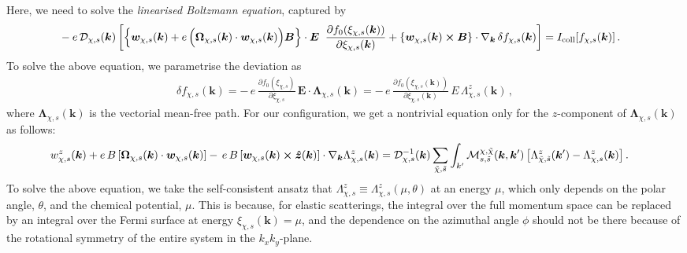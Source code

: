 \documentclass[aps,prb,onecolumn,nofootinbib,citeautoscript,10pt]{revtex4-2}
\begin{document}
Here, we need to solve the \textit{linearised Boltzmann equation}, captured by
\begin{align}
\label{eqkin5}
& - e\, {\mathcal D}_{\chi, s} ({\boldsymbol k})
 \left [
\left \lbrace {\boldsymbol{w}}_{\chi, s} ({\boldsymbol k})
+ e \,\Big(
{\boldsymbol \Omega}_{\chi, s} ({\boldsymbol k}) 
\cdot {\boldsymbol{w}}_{\chi, s}   ({\boldsymbol k})
 \Big )  \boldsymbol B \right \rbrace
\cdot {\boldsymbol E}  
\; \;	\frac{\partial  f_0 (\xi_{\chi, s}({\boldsymbol k})) }
 {\partial \xi_{\chi, s}({\boldsymbol k}) }
+  
\left \lbrace   {\boldsymbol{w}}_{\chi, s} ({\boldsymbol k})
\cross  {\boldsymbol B}  \right \rbrace
\cdot \nabla_{\boldsymbol k}
\, \delta f_{\chi, s} (\boldsymbol k) \right] 
 =  I_{\text{coll}} [f_{\chi, s} ({\boldsymbol k})] \,.
\end{align}
To solve the above equation, we parametrise the deviation as
\begin{align}
\label{eqansatz}
	\delta f_{\chi, s} (\boldsymbol {k}) =
-\,	 e\, 	\frac{\partial  f_0 (\xi_{\chi, s}) } {\partial \xi_{\chi, s} } 
	\,   {\boldsymbol E}  \cdot \bm{\Lambda}_{\chi, s} (\boldsymbol {k} )
=
-\,	 e\, 	\frac{\partial  f_0 (\xi_{\chi, s}({\boldsymbol k})) }
 {\partial \xi_{\chi, s} ({\boldsymbol k})} 
	\,   E \, {\Lambda}^z_{\chi, s} ( \boldsymbol {k} ) \,,
\end{align}
where $ \bm{\Lambda}_{\chi, s} (\boldsymbol {k} ) $ is the vectorial mean-free path. For our configuration, we get a nontrivial equation only for the $z$-component of $ \bm{\Lambda}_{\chi, s} ( \boldsymbol {k} ) $ as follows:
\begin{align}
\label{eqvec}
&  w^z_{\chi, s} ({\boldsymbol k})
+ e \, B \left [
{\boldsymbol \Omega}_{\chi, s}  ({\boldsymbol k})
 \cdot {\boldsymbol{w}}_{\chi, s} ({\boldsymbol k})  \right ]
-\, 
e \, B \left [ {\boldsymbol{w}}_{\chi, s} ({\boldsymbol k}) \cross   
\boldsymbol{\hat z}  ({\boldsymbol k}) \right ] 
\cdot \nabla_{\boldsymbol k} {\Lambda}^z_{\chi, s} (\boldsymbol {k} )  
 = {\mathcal D}^{-1}_{\chi, s}  ({\boldsymbol k})
\sum \limits_{\tilde \chi, \tilde s}
\int_{k'}
\mathcal{M}^{\chi, \tilde \chi}_{ s, \tilde s} (\boldsymbol k,\boldsymbol k^\prime)
\left[ 
 {\Lambda}^z_{ \tilde \chi, \tilde s} (\boldsymbol {k}^\prime ) 
 -  {\Lambda}^z_{\chi, s} (\boldsymbol {k} )  
 \right ].
\end{align}
To solve the above equation, we take the self-consistent ansatz \cite{timm} that 
$ {\Lambda}^z_{\chi, s} \equiv {\Lambda}^z_{\chi, s} ( \mu, \theta)$ at an energy $\mu$, which only depends on the polar angle, $\theta$, and the chemical potential, $\mu$. This is because, for elastic scatterings, the integral over the full momentum space can be replaced by an integral over the Fermi surface at energy $\xi_{\chi , s} (\boldsymbol k) = \mu $, and the dependence on the azimuthal angle $\phi$ should not be there because of the rotational symmetry of the entire system in the $k_x k_y$-plane. 
\end{document}
